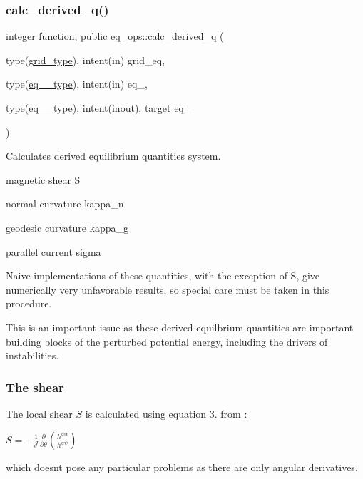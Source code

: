 \subsubsection{\texorpdfstring{calc\+\_\+derived\+\_\+q()}{calc\_derived\_q()}}
{\footnotesize\ttfamily integer function, public eq\+\_\+ops\+::calc\+\_\+derived\+\_\+q (\begin{DoxyParamCaption}\item[{type(\hyperlink{structgrid__vars_1_1grid__type}{grid\+\_\+type}), intent(in)}]{grid\+\_\+eq,  }\item[{type(\hyperlink{structeq__vars_1_1eq__1__type}{eq\+\_\+1\+\_\+type}), intent(in)}]{eq\+\_,  }\item[{type(\hyperlink{structeq__vars_1_1eq__2__type}{eq\+\_\+2\+\_\+type}), intent(inout), target}]{eq\+\_ }\end{DoxyParamCaption})}



Calculates derived equilibrium quantities system. 


\begin{DoxyItemize}
\item magnetic shear {\ttfamily S} 
\item normal curvature {\ttfamily kappa\+\_\+n} 
\item geodesic curvature {\ttfamily kappa\+\_\+g} 
\item parallel current {\ttfamily sigma} 
\end{DoxyItemize}

Naive implementations of these quantities, with the exception of {\ttfamily S}, give numerically very unfavorable results, so special care must be taken in this procedure.

This is an important issue as these derived equilbrium quantities are important building blocks of the perturbed potential energy, including the drivers of instabilities.

\subsubsection*{The shear }

The local shear $S$ is calculated using equation 3. from \cite{Weyens3D} \+:

$S = - \frac{1}{\mathcal{J}} \frac{\partial}{\partial \theta} \left(\frac{ h^{\psi\alpha}}{ h^{\psi \psi}}\right)$

which doesn\textquotesingle{}t pose any particular problems as there are only angular derivatives.

